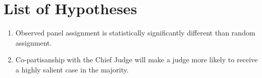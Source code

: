 \documentclass[12pt]{article}
\begin{document}
\singlespacing



\appendix
\section{List of Hypotheses}
\begin{enumerate}
	\item Observed panel assignment is statistically significantly different than random assignment.
	\item Co-partisanship with the Chief Judge will make a judge more likely to receive a highly salient case in the majority.  
\end{enumerate}
\end{document}
